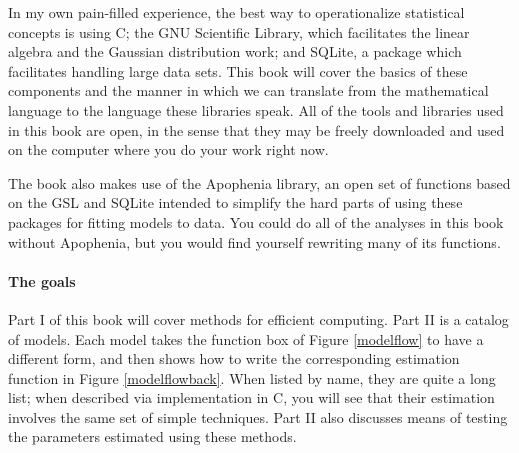 In my own pain-filled experience, the best way to operationalize
statistical concepts is using C; the GNU Scientific Library,  which
facilitates the linear algebra and the Gaussian distribution work;
and SQLite, a package which facilitates handling large data sets. This
book will cover the basics of these components and the manner in which
we can translate from the mathematical language to the language these
libraries speak.  All of the tools and libraries
used in this book are open, in the sense that they may be freely
downloaded and used on the computer where you do your work right now.

The book also makes use of the Apophenia library, an open set of
functions based on the GSL and SQLite intended to simplify the hard
parts of using these packages for fitting models to data. You could do
all of the analyses in this book without Apophenia, but you would find
yourself rewriting many of its functions.


\paragraph{The goals}
Part I of this book will cover methods for efficient computing. Part II
is a catalog of models. Each model takes the
function box of Figure \ref{modelflow} to have a different form, and
then shows how to write the corresponding estimation function in Figure
\ref{modelflowback}. When listed by name, they are quite a long list; when
described via implementation in C, you will see that their estimation
involves the same set of simple techniques.  Part II also discusses
means of testing the parameters estimated using these methods.

